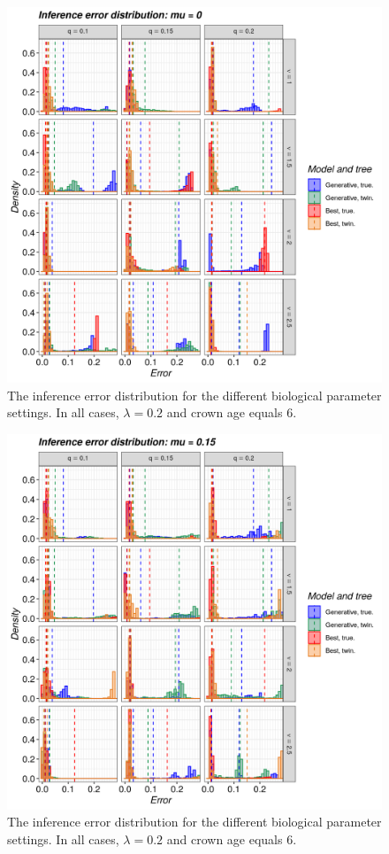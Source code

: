\begin{figure}[!htbp]
  \includegraphics[width=\textwidth]{20190829_figure_1a.png}
  \caption{
    The inference error distribution 
    for the different biological
    parameter settings. In all cases, $\lambda = 0.2$ and 
    crown age equals 6. 
  }
  \label{fig:results}
\end{figure}

\begin{figure}[!htbp]
  \includegraphics[width=\textwidth]{20190829_figure_1b.png}
  \caption{
    The inference error distribution 
    for the different biological
    parameter settings. In all cases, $\lambda = 0.2$ and 
    crown age equals 6. 
  }
  \label{fig:results}
\end{figure}